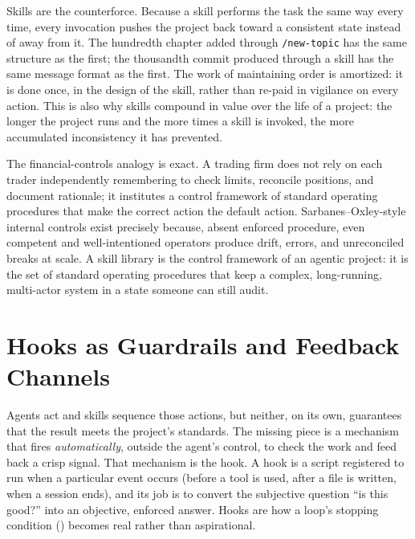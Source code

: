 Skills are the counterforce. Because a skill performs the task the same way every time, every invocation pushes the project back toward a consistent state instead of away from it. The hundredth chapter added through \texttt{/new-topic} has the same structure as the first; the thousandth commit produced through a skill has the same message format as the first. The work of maintaining order is amortized: it is done once, in the design of the skill, rather than re-paid in vigilance on every action. This is also why skills compound in value over the life of a project: the longer the project runs and the more times a skill is invoked, the more accumulated inconsistency it has prevented.

\begin{context}
The financial-controls analogy is exact. A trading firm does not rely on each trader independently remembering to check limits, reconcile positions, and document rationale; it institutes a control framework of standard operating procedures that make the correct action the default action. Sarbanes--Oxley-style internal controls exist precisely because, absent enforced procedure, even competent and well-intentioned operators produce drift, errors, and unreconciled breaks at scale. A skill library is the control framework of an agentic project: it is the set of standard operating procedures that keep a complex, long-running, multi-actor system in a state someone can still audit.
\end{context}


\section{Hooks as Guardrails and Feedback Channels}\label{sec:hooks-as-guardrails}

Agents act and skills sequence those actions, but neither, on its own, guarantees that the result meets the project's standards. The missing piece is a mechanism that fires \emph{automatically}, outside the agent's control, to check the work and feed back a crisp signal. That mechanism is the hook. A hook is a script registered to run when a particular event occurs (before a tool is used, after a file is written, when a session ends), and its job is to convert the subjective question ``is this good?'' into an objective, enforced answer. Hooks are how a loop's stopping condition () becomes real rather than aspirational.

